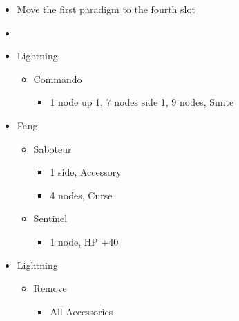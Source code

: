 \documentclass{report}
\begin{document}
\begin{menu}
\begin{itemize}
    \paradigm
    \begin{itemize}
        \item Move the first paradigm to the fourth slot
        \item {}%
{\paradigmline{(\rav)}{\syn}{\sab}}%
{\paradigmline{(\rav)}{\rav}{(\sab)}}%
{\paradigmline{(\rav)}{(\rav)}{\sen}}%
{\paradigmline{\textit{\rav}}{\textit{\rav}}{\textit{\com}}}%
{\paradigmline{[\com]}{\rav}{\com}}%
{\paradigmline{[\com]}{\rav}{\com}}
    \end{itemize}
    \crystarium
    \begin{itemize}
        \item Lightning
        \begin{itemize}
            \item Commando
            \begin{itemize}
                \item 1 node up 1, 7 nodes side 1, 9 nodes, Smite
            \end{itemize}
        \end{itemize}
        \item Fang
        \begin{itemize}
            \item Saboteur
            \begin{itemize}
                \item 1 side, Accessory
                \item 4 nodes, Curse
            \end{itemize}
            \item Sentinel
            \begin{itemize}
                \item 1 node, HP +40
            \end{itemize}
        \end{itemize}
    \end{itemize}
    \equip
    \begin{itemize}
        \item Lightning
        \begin{itemize}
            \item Remove
            \begin{itemize}
                \item All Accessories
            \end{itemize}

\end{itemize}
\end{itemize}
\end{itemize}
\end{menu}
\end{document}
